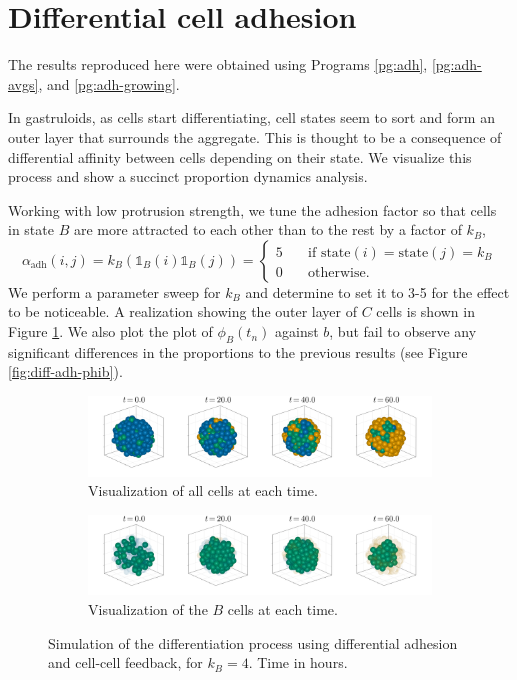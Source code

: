 \section{Differential cell adhesion}

The results reproduced here were obtained using Programs \ref{pg:adh}, \ref{pg:adh-avgs}, and \ref{pg:adh-growing}.

In gastruloids, as cells start differentiating, cell states seem to sort and form an outer layer that surrounds the aggregate. This is thought to be a consequence of differential affinity between cells depending on their state. We visualize this process and show a succinct proportion dynamics analysis.

Working with low protrusion strength, we tune the adhesion factor so that cells in state $B$ are more attracted to each other than to the rest by a factor of $k_B$,
\begin{equation*}
    \alpha_\text{adh}(i,j)= k_B(\mathds{1}_B(i)\mathds{1}_B(j))=
    \begin{cases}
        5 &\quad \text{if $\text{state}(i)=\text{state}(j)=k_B$}\\
        0 &\quad \text{otherwise}.
    \end{cases}
\end{equation*}
We perform a parameter sweep for $k_B$ and determine to set it to 3-5 for the effect to be noticeable. A realization showing the outer layer of $C$ cells is shown in Figure \ref{fig:aggregate-layer}. We also plot the plot of $\phi_B(t_n)$ against $b$, but fail to observe any significant differences in the proportions to the previous results (see Figure \ref{fig:diff-adh-phib}).

\begin{figure}[h]
    \centering
    \begin{subfigure}{\textwidth}
        \centering
        \includegraphics[width=\textwidth]{figures/409/409-aggregate-all.png}
        \caption{Visualization of all cells at each time.}
    \end{subfigure}
    \hfill
    \begin{subfigure}{\textwidth}
        \centering
        \includegraphics[width=\textwidth]{figures/409/409-aggregate-b.png}
        \caption{Visualization of the $B$ cells at each time.}
    \end{subfigure}
    \caption{Simulation of the differentiation process using differential adhesion and cell-cell feedback, for $k_B=4$. Time in hours.}
    \label{fig:aggregate-layer}
\end{figure}

